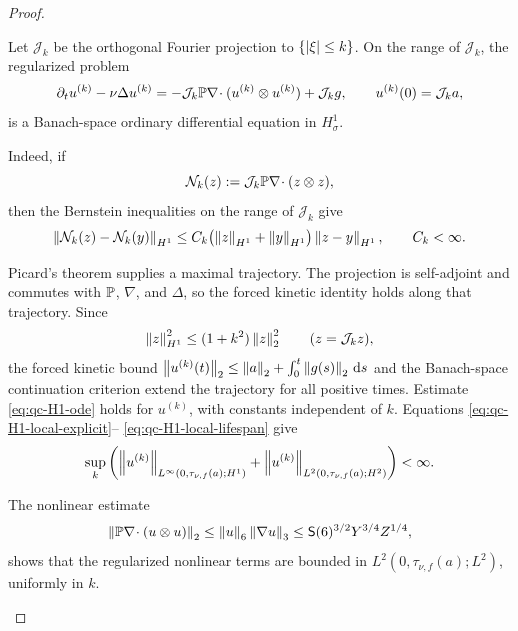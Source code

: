 \begin{proof}
\begin{samepage}
Let \(\mathcal J_k\) be the orthogonal Fourier projection to
\(\{\left|\xi\right|\le k\}\).  On the range of \(\mathcal J_k\), the regularized
problem
\begin{equation}
 \partial_tu^{(k)}-\nu\Delta u^{(k)}
 =-\mathcal J_k\mathbb P\nabla\!\cdot
   (u^{(k)}\otimes u^{(k)})+\mathcal J_kg,
 \qquad u^{(k)}(0)=\mathcal J_ka,
 \label{eq:qc-H1-Friedrichs-system}
\end{equation}
is a Banach-space ordinary differential equation in \(H^1_\sigma\).
\end{samepage}
\begin{samepage}
Indeed, if
\[
 \mathcal N_k(z):=\mathcal J_k\mathbb P\nabla\!\cdot(z\otimes z),
\]
then the Bernstein inequalities on the range of \(\mathcal J_k\) give
\begin{equation}
 \left\lVert \mathcal N_k(z)-\mathcal N_k(y)\right\rVert_{H^1}
 \le C_k\bigl(\left\lVert z\right\rVert_{H^1}+\left\lVert y\right\rVert_{H^1}\bigr)
       \left\lVert z-y\right\rVert_{H^1},
 \qquad C_k<\infty.
 \label{eq:qc-H1-Friedrichs-Lipschitz}
\end{equation}
\end{samepage}
Picard's theorem supplies a maximal trajectory.  The projection is
self-adjoint and commutes with \(\mathbb P\), \(\nabla\), and \(\Delta\), so the
forced kinetic identity holds along that trajectory.  Since
\begin{equation}
 \left\lVert z\right\rVert_{H^1}^2\le(1+k^2)\left\lVert z\right\rVert_2^2
 \qquad(z=\mathcal J_kz),
 \label{eq:qc-H1-Friedrichs-band-control}
\end{equation}
the forced kinetic bound \(\left\lVert u^{(k)}(t)\right\rVert_2\le
\left\lVert a\right\rVert_2+\int_0^t\left\lVert g(s)\right\rVert_2\,\mathrm d s\) and the Banach-space continuation criterion extend the
trajectory for all positive times.  Estimate
\eqref{eq:qc-H1-ode} holds for \(u^{(k)}\), with constants independent of
\(k\).  Equations \eqref{eq:qc-H1-local-explicit}--%
\eqref{eq:qc-H1-local-lifespan} give
\begin{equation}
 \sup_k\left(
 \left\lVert u^{(k)}\right\rVert_{L^\infty(0,\tau_{\nu,f}(a);H^1)}
 +\left\lVert u^{(k)}\right\rVert_{L^2(0,\tau_{\nu,f}(a);H^2)}
 \right)<\infty.
 \label{eq:qc-H1-Friedrichs-uniform}
\end{equation}
\begin{samepage}
The nonlinear estimate
\[
 \left\lVert \mathbb P\nabla\!\cdot(u\otimes u)\right\rVert_2
 \le \left\lVert u\right\rVert_6\left\lVert \nabla u\right\rVert_3
 \le \mathsf S(6)^{3/2}Y^{3/4}Z^{1/4},
\]
shows that the regularized nonlinear terms are bounded in
\(L^2(0,\tau_{\nu,f}(a);L^2)\), uniformly in \(k\).
\par
\end{samepage}

\end{proof}
